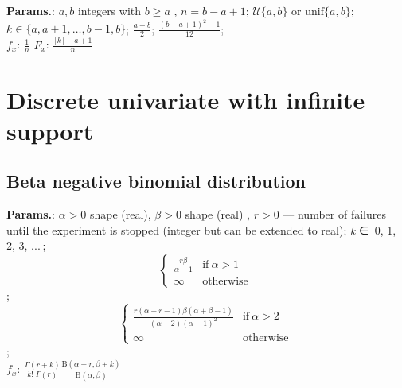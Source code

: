     {\color{darkblue} \textbf{Params.}:} {$a,b$ integers with $b \geq a$ ,  $n=b-a+1$}; {$\mathcal{U}\{a, b\}$ or $\mathrm{unif}\{a,b\}$}; {$k \in \{a,a+1,\dots,b-1,b\}$}; {$\frac{a+b}{2}$}; {$\frac{(b-a+1)^2-1}{12}$};\hspace{0.5cm}\\{\color{darkblue} \textbf{$f_x$}:} {$\frac{1}{n}$}{\color{darkblue} \textbf{$F_x$}:} {$ \frac{\lfloor k \rfloor -a+1}{n} $}



    


    \section{Discrete univariate with infinite support}
        

        
    
        
\subsection{Beta negative binomial distribution}





    {\color{darkblue} \textbf{Params.}:} {$\alpha > 0$ shape (real),  $\beta > 0$ shape (real) ,  $r > 0$ — number of failures until the experiment is stopped (integer but can be extended to real)}; {\textit{k} ∈ { 0, 1, 2, 3, ... }}; {$$\begin{cases}
              \frac{r\beta}{\alpha-1} & \text{if}\ \alpha>1    \\
              \infty & \text{otherwise}\ \end{cases}$$}; {$$\begin{cases}
              \frac{r(\alpha+r-1)\beta(\alpha+\beta-1)}{(\alpha-2){(\alpha-1)}^2} & \text{if}\ \alpha>2    \\
              \infty & \text{otherwise}\ \end{cases}$$};\hspace{0.5cm}\\{\color{darkblue} \textbf{$f_x$}:} {$\frac{\Gamma(r+k)}{k!\;\Gamma(r)} \frac{\mathrm{B}(\alpha+r,\beta+k)} {\mathrm{B}(\alpha,\beta)}$}



